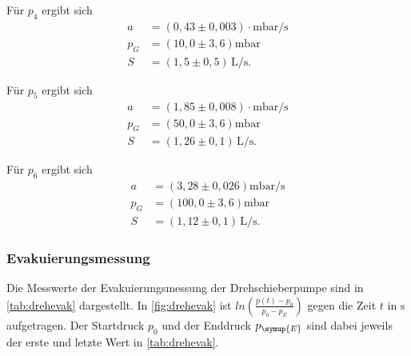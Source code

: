 Für $p_4$ ergibt sich
\begin{align*}
  a &= (0,43 \pm 0,003)\cdot \si{\milli\bar\per\second} \\
  p_G &= (10,0 \pm 3,6)  \si{\milli\bar} \\
  S &= (1,5 \pm 0,5)\,\si{\liter\per\second}.
\end{align*}

Für $p_5$ ergibt sich
\begin{align*}
  a &= (1,85 \pm 0,008)\cdot \si{\milli\bar\per\second} \\
  p_G &= (50,0 \pm 3,6)  \si{\milli\bar} \\
  S &= (1,26 \pm 0,1)\,\si{\liter\per\second}.
\end{align*}

Für $p_6$ ergibt sich
\begin{align*}
  a &= (3,28 \pm 0,026) \si{\milli\bar\per\second} \\
  p_G &= (100,0 \pm 3,6) \si{\milli\bar} \\
  S &= (1,12 \pm 0,1)\,\si{\liter\per\second}.
\end{align*}


\subsubsection{Evakuierungsmessung}
Die Messwerte der Evakuierungsmessung der Drehschieberpumpe sind in \autoref{tab:drehevak} dargestellt. In
\autoref{fig:drehevak} ist $ln(\frac{p(t)-p_0}{p_0 - p_E})$ gegen die Zeit $t$ in $\si{\second}$ aufgetragen. Der
Startdruck $p_{0}$ und der Enddruck $p_{\symup{E}}$ sind dabei jeweils der erste und letzte Wert in
\autoref{tab:drehevak}.

